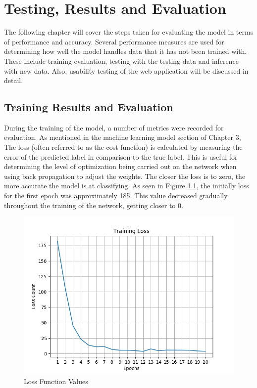 \chapter{Testing, Results and Evaluation}
The following chapter will cover the steps taken for evaluating the model in terms of performance and accuracy. Several performance measures are used for determining how well the model handles data that it has not been trained with. These include training evaluation, testing with the testing data and inference with new data. Also, usability testing of the web application will be discussed in detail.

\section{Training Results and Evaluation}
During the training of the model, a number of metrics were recorded for evaluation.  As mentioned in the machine learning model section of Chapter 3, The loss (often referred to as the cost function) is calculated by measuring the error of the predicted label in comparison to the true label. This is useful for determining the level of optimization being carried out on the network when using back propagation to adjust the weights. The closer the loss is to zero, the more accurate the model is at classifying. As seen in Figure \ref{loss}, the initially loss for the first epoch was approximately 185. This value decreased gradually throughout the training of the network, getting closer to 0.

\begin{figure}[ht]
	\begin{center}
		\advance\leftskip-3cm
		\advance\rightskip-3cm
		\includegraphics[keepaspectratio=true,scale=0.7]{__resources/Results/loss.jpg}
		\caption{Loss Function Values}
		\label{loss}
	\end{center}
\end{figure}

